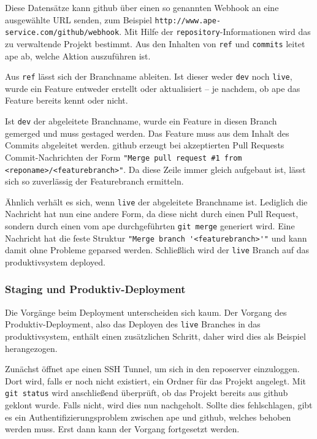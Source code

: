 Diese Datensätze kann \gls{github} über einen so genannten Webhook an eine ausgewählte URL senden, zum Beispiel \lstinline!http://www.ape-service.com/github/webhook!. Mit Hilfe der \lstinline!repository!-Informationen wird das zu verwaltende Projekt bestimmt. Aus den Inhalten von \lstinline!ref! und \lstinline!commits! leitet \gls{ape} ab, welche Aktion auszuführen ist.

Aus \lstinline!ref! lässt sich der Branchname ableiten. Ist dieser weder \lstinline!dev! noch \lstinline!live!, wurde ein Feature entweder erstellt oder aktualisiert -- je nachdem, ob \gls{ape} das Feature bereits kennt oder nicht.

Ist \lstinline!dev! der abgeleitete Branchname, wurde ein Feature in diesen Branch gemerged und muss gestaged werden. Das Feature muss aus dem Inhalt des Commits abgeleitet werden. \gls{github} erzeugt bei akzeptierten Pull Requests Commit-Nachrichten der Form \lstinline!"Merge pull request #1 from <reponame>/<featurebranch>"!. Da diese Zeile immer gleich aufgebaut ist, lässt sich so zuverlässig der Featurebranch ermitteln.

Ähnlich verhält es sich, wenn \lstinline!live! der abgeleitete Branchname ist. Lediglich die Nachricht hat nun eine andere Form, da diese nicht durch einen Pull Request, sondern durch einen vom \gls{ape} durchgeführten \lstinline!git merge! generiert wird. Eine Nachricht hat die feste Struktur \lstinline!"Merge branch '<featurebranch>'"! und kann damit ohne Probleme geparsed werden. Schließlich wird der \lstinline!live! Branch auf das \gls{produktivsystem} deployed.


\subsubsection{Staging und Produktiv-Deployment} %
\label{ssub:staging_und_produktiv_deployment}

Die Vorgänge beim Deployment unterscheiden sich kaum. Der Vorgang des Produktiv-Deployment, also das Deployen des \lstinline!live! Branches in das \gls{produktivsystem}, enthält einen zusätzlichen Schritt, daher wird dies als Beispiel herangezogen.

Zunächst öffnet \gls{ape} einen SSH Tunnel, um sich in den \gls{reposerver} einzuloggen. Dort wird, falls er noch nicht existiert, ein Ordner für das Projekt angelegt. Mit \lstinline!git status! wird anschließend überprüft, ob das Projekt bereits aus \gls{github} geklont wurde. Falls nicht, wird dies nun nachgeholt. Sollte dies fehlschlagen, gibt es ein Authentifizierungsproblem zwischen \gls{ape} und \gls{github}, welches behoben werden muss. Erst dann kann der Vorgang fortgesetzt werden.

